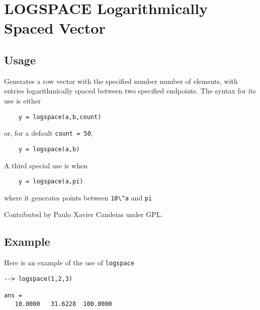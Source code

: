 \section{LOGSPACE Logarithmically Spaced Vector}

\subsection{Usage}

Generates a row vector with the specified number number of elements,
with entries logarithmically spaced between two specified endpoints.
The syntax for its use is either
\begin{verbatim}
    y = logspace(a,b,count)
\end{verbatim}
 or, for a default \verb|count = 50|,
\begin{verbatim}
    y = logspace(a,b)
\end{verbatim}
 A third special use is when
\begin{verbatim}
    y = logspace(a,pi)
\end{verbatim}
where it generates points between \verb|10\^a| and \verb|pi|

Contributed by Paulo Xavier Candeias under GPL.
\subsection{Example}

Here is an example of the use of \verb|logspace|
\begin{verbatim}
--> logspace(1,2,3)

ans = 
   10.0000   31.6228  100.0000 
\end{verbatim}
